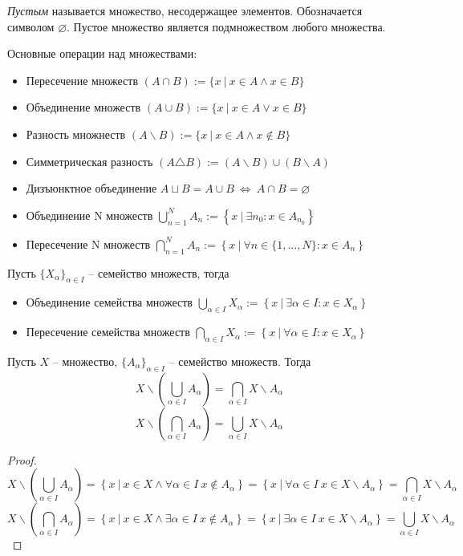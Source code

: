 \textit{Пустым} называется множество, несодержащее элементов. Обозначается символом $\varnothing$. Пустое множество является подмножеством любого множества.

Основные операции над множествами:
\begin{itemize}
\item[] Пересечение множеств $(A \cap B) := \{x \ \vert \  x \in A \wedge x \in B\}$
\item[] Объединение множеств $(A \cup B) := \{x \ \vert \ x \in A \vee x \in B\}$
\item[] Разность множнеств $(A \backslash B) := \{x \ \vert \ x \in A \wedge x \notin B\}$
\item[] Симметрическая разность $(A \triangle B) := (A \backslash B) \cup (B \backslash A)$
\item[] Дизъюнктное объединение $A \sqcup B = A \cup B \ \Leftrightarrow \ A \cap B = \varnothing$
\item[] Объединение N множеств $\bigcup_{n = 1}^{N} A_n := \left\{x \ \vert \ \exists n_0 : x \in A_{n_0}\right\}$
\item[] Пересечение N множеств $\bigcap_{n = 1}^{N} A_n := \left\{x \ \vert \ \forall n \in \{1, ..., N\} : x \in A_{n}\right\}$
\end{itemize}
Пусть $\{X_\alpha\}_{\alpha \in I}$ -- семейство множеств, тогда
\begin{itemize}
\item[] Объединение семейства множеств $\bigcup_{\alpha \in I} X_\alpha := \left\{x \ \vert \ \exists \alpha \in I : x \in X_{\alpha}\right\}$
\item[] Пересечение семейства множеств $\bigcap_{\alpha \in I} X_\alpha := \left\{x \ \vert \ \forall \alpha \in I : x \in X_{\alpha}\right\}$
\end{itemize}
\begin{theorem}
    Пусть $X$ -- множество, $\{A_\alpha\}_{\alpha \in I}$ -- семейство множеств. Тогда
   \begin{equation}
   X \backslash \left(\bigcup_{\alpha \in I} A_\alpha \right) = \bigcap_{\alpha \in I} X \backslash A_{\alpha}
   \end{equation}
   \begin{equation}
   X \backslash \left(\bigcap_{\alpha \in I} A_\alpha \right) = \bigcup_{\alpha \in I} X \backslash A_{\alpha}
   \end{equation}
\end{theorem}
\begin{proof}
$$ X \backslash \left(\bigcup_{\alpha \in I} A_\alpha \right) = \left\{x \ \vert \ x \in X \wedge \forall \alpha \in I \ x \notin A_\alpha \right\}
= \left\{x \ \vert \ \forall \alpha \in I \ x \in X \backslash A_\alpha \right\} = \bigcap_{\alpha \in I} X \backslash A_{\alpha}$$
$$ X \backslash \left(\bigcap_{\alpha \in I} A_\alpha \right) = \left\{ x \ \vert \ x \in X \wedge \exists \alpha \in I \ x \notin A_\alpha \right\} =
\left\{x \ \vert \ \exists \alpha \in I \ x \in X \backslash A_\alpha \right\} = \bigcup_{\alpha \in I} X \backslash A_{\alpha}$$
\end{proof}
